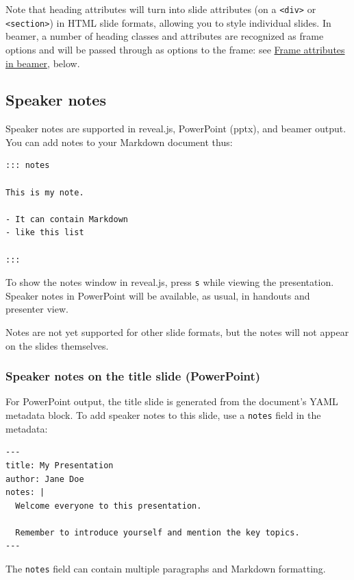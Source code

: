 \documentclass[
]{article}
\begin{document}
Note that heading attributes will turn into slide attributes (on a
\texttt{\textless{}div\textgreater{}} or
\texttt{\textless{}section\textgreater{}}) in HTML slide formats,
allowing you to style individual slides. In beamer, a number of heading
classes and attributes are recognized as frame options and will be
passed through as options to the frame: see
\protect\hyperlink{frame-attributes-in-beamer}{Frame attributes in
beamer}, below.

\hypertarget{speaker-notes}{%
\subsection{Speaker notes}\label{speaker-notes}}

Speaker notes are supported in reveal.js, PowerPoint (pptx), and beamer
output. You can add notes to your Markdown document thus:

\begin{verbatim}
::: notes

This is my note.

- It can contain Markdown
- like this list

:::
\end{verbatim}

To show the notes window in reveal.js, press \texttt{s} while viewing
the presentation. Speaker notes in PowerPoint will be available, as
usual, in handouts and presenter view.

Notes are not yet supported for other slide formats, but the notes will
not appear on the slides themselves.

\hypertarget{speaker-notes-on-the-title-slide-powerpoint}{%
\subsubsection{Speaker notes on the title slide
(PowerPoint)}\label{speaker-notes-on-the-title-slide-powerpoint}}

For PowerPoint output, the title slide is generated from the document's
YAML metadata block. To add speaker notes to this slide, use a
\texttt{notes} field in the metadata:

\begin{verbatim}
---
title: My Presentation
author: Jane Doe
notes: |
  Welcome everyone to this presentation.

  Remember to introduce yourself and mention the key topics.
---
\end{verbatim}

The \texttt{notes} field can contain multiple paragraphs and Markdown
formatting.
\end{document}
